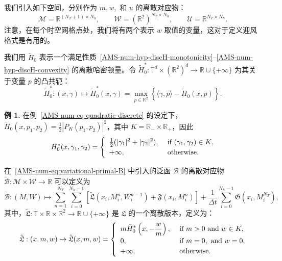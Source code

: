 \documentclass{amsproc}
\theoremstyle{definition}
\newtheorem{example}[theorem]{例}
\theoremstyle{remark}
\numberwithin{equation}{section}
\newcommand{\RR}{{\mathbb R}}
\newcommand{\TT}{{\mathbb T}}
\newcommand{\cB}{{\mathcal B}}
\newcommand{\cM}{{\mathcal M}}
\newcommand{\cU}{{\mathcal U}}
\newcommand{\cW}{{\mathcal W}}
\begin{document}
 我们引入如下空间，分别作为 $m,w,$ 和 $u$ 的离散对应物：
$$
	\cM = \RR^{(N_T+1) \times N_h}, 
	\qquad 
	\cW = (\RR^2)^{N_T \times N_h}, 
	\qquad
	\cU = \RR^{N_T \times N_h}.
$$
注意，在每个时空网格点处，我们将有两个表示 $w$ 取值的变量，这对于定义迎风格式是有用的。

我们用 $\tilde H_0$ 表示一个满足性质~\ref{AMS-num-hyp-discH-monotonicity}--\ref{AMS-num-hyp-discH-convexity} 的离散哈密顿量。令 $\tilde H^*_0: \TT^d \times (\RR^2)^d \to \RR \cup \{+\infty\}$ 为其关于变量 $p$ 的凸共轭：
\begin{equation}
\label{eq:var:1}  
	\tilde H^*_0: 
	(x,\gamma) \mapsto 
	\tilde H^*_0(x, \gamma)
	=
	\max_{p \in \RR^2} \left\{ \langle \gamma , p \rangle - \tilde H_0(x, p) \right\}.
\end{equation}


\begin{example}\label{sec:discr-vers-vari-2}
	在例~\ref{AMS-num-eq-quadratic-discrete} 的设定下，$\tilde H_0(x, p_1, p_2) = \tfrac{1}{2} |P_K(p_1,p_2)|^2$，其中 $K = \RR_- \times \RR_+$，因此
	$$
		\tilde H^*_0(x, \gamma_1, \gamma_2)
		=
		\begin{cases}
			\displaystyle
			\,\,  \tfrac{1}{2}(|\gamma_1|^2 + |\gamma_2|^2), &\hbox{ if } (\gamma_1,\gamma_2) \in K,
			\\
			\,\, +\infty, &\hbox{ otherwise.}
		\end{cases}
	$$
\end{example}
在~\eqref{AMS-num-eq:variational-primal-B} 中引入的泛函 $\cB$ 的离散对应物 $\tilde\cB: \cM \times \cW \to \RR$ 可以定义为
\begin{equation}
\label{eq:var:2}  
	\tilde\cB:
	(M,W) \mapsto
	\sum_{n=1}^{N_T} \sum_{i=0}^{N_h-1} \left[ \tilde{\mathfrak{L}}(x_i, M^n_i, W^{n-1}_i) + \mathfrak{F}(x_i, M^n_i) \right] + \frac{1}{\Delta t}  \sum_{i=0}^{N_h-1}  \mathfrak{G}(x_i, M^{N_T}_i),
      \end{equation}
      其中，$\tilde{\mathfrak{L}}: \TT \times \RR \times \RR^2 \to \RR \cup \{+\infty\}$ 是 $\mathfrak{L}$ 的一个离散版本，定义为：
\begin{equation}
\label{eq:var:3}  
	\tilde{\mathfrak{L}}:
	 (x,m,w) \mapsto \tilde{\mathfrak{L}}(x,m,w)
	 =
	\begin{cases}
		\displaystyle
		\,\, m \tilde H^*_0\left(x,-\frac{w}{m}\right), &\hbox{ if } m > 0 \hbox{ and } w \in K,
		\\
		\,\, 0, &\hbox{ if } m=0, \hbox{ and } w= 0,
		\\
		\,\, +\infty, &\hbox{ otherwise.}
	\end{cases}
      \end{equation}
\end{document}
